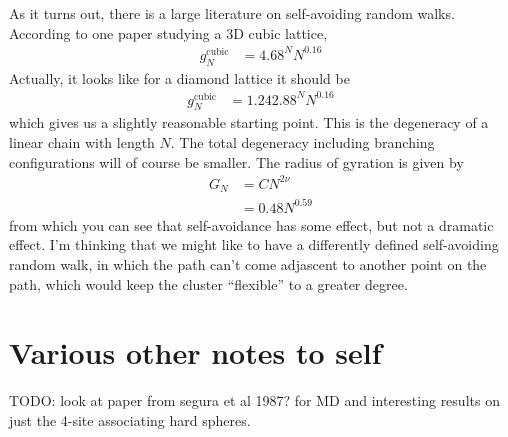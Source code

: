 \documentclass[letterpaper,twocolumn,amsmath,amssymb,pre]{revtex4-1}
\begin{document}
As it turns out, there is a large literature on self-avoiding random
walks.  According to one paper studying a 3D cubic
lattice\cite{grassberger1993monte},
\begin{align}
  g_N^{\text{cubic}} &= 4.68^N N^{0.16}
\end{align}
Actually, it looks like for a diamond lattice it should
be\cite{chen2002universal}
\begin{align}
  g_N^{\text{cubic}} &= 1.24 2.88^N N^{0.16}
\end{align}
which gives us a slightly reasonable starting point.  This is the
degeneracy of a linear chain with length $N$.  The total degeneracy
including branching configurations will of course be smaller.  The
radius of gyration is given by
\begin{align}
  G_N &= C N^{2\nu} \\
  &= 0.48 N^{0.59}
\end{align}
from which you can see that self-avoidance has some effect, but not a
dramatic effect.  I'm thinking that we might like to have a
differently defined self-avoiding random walk, in which the path can't
come adjascent to another point on the path, which would keep the
cluster ``flexible'' to a greater degree.

\section{Various other notes to self}

TODO: look at paper from segura et al 1987? for MD and interesting
results on just the 4-site associating hard spheres.

\end{document}
